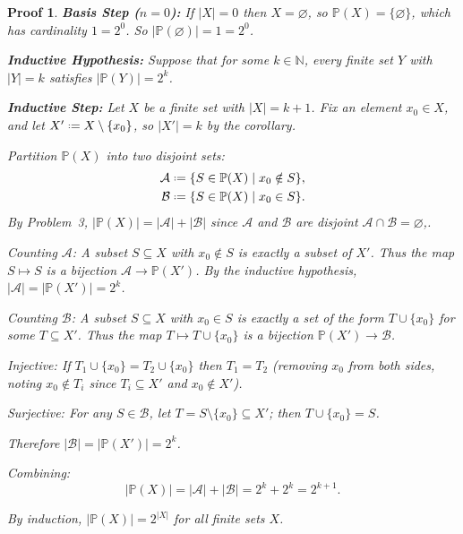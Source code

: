\documentclass[12pt]{article}
\newcommand{\defeq}{\mathrel{\vcenter{\baselineskip0.5ex \lineskiplimit0pt
                     \hbox{\scriptsize.}\hbox{\scriptsize.}}}=}
\newcommand{\Pow}{\mathbb{P}}
\newcommand{\N}{\mathbb{N}}
\theoremstyle{proofstyle}
\newtheorem*{proof*}{Proof}
\begin{document}
\begin{enumerate}[left=0pt, itemsep=2em, parsep=1em]
\begin{proof*}
\textbf{Basis Step ($n = 0$):} If $|X| = 0$ then $X = \varnothing$, so $\Pow(X) = \{\varnothing\}$, which has cardinality $1 = 2^0$. So $|\Pow(\varnothing)| = 1= 2^{0}$.

\textbf{Inductive Hypothesis:} Suppose that for some $k \in \N$, every finite set $Y$ with $|Y| = k$ satisfies $|\Pow(Y)| = 2^k$.

\textbf{Inductive Step:} Let $X$ be a finite set with $|X| = k + 1$. Fix an element $x_0 \in X$, and let $X' \defeq X \setminus \{x_0\}$, so $|X'| = k$ by the corollary.

Partition $\Pow(X)$ into two disjoint sets:
\begin{align*}
  \mathcal{A} &\defeq \{ S \in \Pow(X) \mid x_0 \notin S \}, \\
  \mathcal{B} &\defeq \{ S \in \Pow(X) \mid x_0 \in S \}.
\end{align*}
By Problem~3, $|\Pow(X)| = |\mathcal{A}| + |\mathcal{B}|$ since $\mathcal{A}$ and $\mathcal{B}$ are disjoint $\mathcal{A} \cap \mathcal{B} = \varnothing$,.

\textit{Counting $\mathcal{A}$:} A subset $S \subseteq X$ with $x_0 \notin S$ is exactly a subset of $X'$. Thus the map $S \mapsto S$ is a bijection $\mathcal{A} \to \Pow(X')$. By the inductive hypothesis, $|\mathcal{A}| = |\Pow(X')| = 2^k$.

\textit{Counting $\mathcal{B}$:} A subset $S \subseteq X$ with $x_0 \in S$ is exactly a set of the form $T \cup \{x_0\}$ for some $T \subseteq X'$. Thus the map $T \mapsto T \cup \{x_0\}$ is a bijection $\Pow(X') \to \mathcal{B}$.

\quad \textit{Injective:} If $T_1 \cup \{x_0\} = T_2 \cup \{x_0\}$ then $T_1 = T_2$ (removing $x_0$ from both sides, noting $x_0 \notin T_i$ since $T_i \subseteq X'$ and $x_0 \notin X'$).

\quad \textit{Surjective:} For any $S \in \mathcal{B}$, let $T = S \setminus \{x_0\} \subseteq X'$; then $T \cup \{x_0\} = S$.

Therefore $|\mathcal{B}| = |\Pow(X')| = 2^k$.

Combining:
\[
  |\Pow(X)| = |\mathcal{A}| + |\mathcal{B}| = 2^k + 2^k = 2^{k+1}.
\]

By induction, $|\Pow(X)| = 2^{|X|}$ for all finite sets $X$.
\end{proof*}

\end{enumerate}
\end{document}
